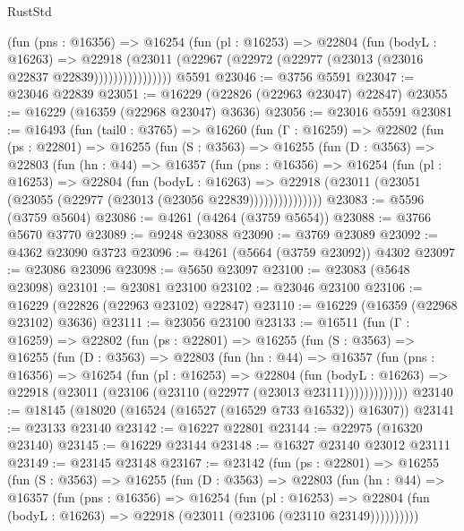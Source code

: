 \begin{lexlean}{RustStd}
\begin{coremodule}
                  (fun (pns : @16356) =>
                  @16254
                    (fun (pl : @16253) =>
                    @22804
                      (fun (bodyL : @16263) =>
                      @22918
                        (@23011
                          (@22967 (@22972 (@22977 (@23013 (@23016 @22837 @22839))))))))))))))))
    @5591
@23046 := @3756 @5591
@23047 := @23046 @22839
@23051 := @16229 (@22826 (@22963 @23047) @22847)
@23055 := @16229 (@16359 (@22968 @23047) @3636)
@23056 := @23016 @5591
@23081 := @16493
    (fun (tail0 : @3765) =>
    @16260
      (fun (Γ : @16259) =>
      @22802
        (fun (ps : @22801) =>
        @16255
          (fun (S : @3563) =>
          @16255
            (fun (D : @3563) =>
            @22803
              (fun (hn : @44) =>
              @16357
                (fun (pns : @16356) =>
                @16254
                  (fun (pl : @16253) =>
                  @22804
                    (fun (bodyL : @16263) =>
                    @22918 (@23011 (@23051 (@23055 (@22977 (@23013 (@23056 @22839)))))))))))))))
@23083 := @5596 (@3759 @5604)
@23086 := @4261 (@4264 (@3759 @5654))
@23088 := @3766 @5670 @3770
@23089 := @9248 @23088
@23090 := @3769 @23089
@23092 := @4362 @23090 @3723
@23096 := @4261 (@5664 (@3759 @23092)) @4302
@23097 := @23086 @23096
@23098 := @5650 @23097
@23100 := @23083 (@5648 @23098)
@23101 := @23081 @23100
@23102 := @23046 @23100
@23106 := @16229 (@22826 (@22963 @23102) @22847)
@23110 := @16229 (@16359 (@22968 @23102) @3636)
@23111 := @23056 @23100
@23133 := @16511
    (fun (Γ : @16259) =>
    @22802
      (fun (ps : @22801) =>
      @16255
        (fun (S : @3563) =>
        @16255
          (fun (D : @3563) =>
          @22803
            (fun (hn : @44) =>
            @16357
              (fun (pns : @16356) =>
              @16254
                (fun (pl : @16253) =>
                @22804
                  (fun (bodyL : @16263) =>
                  @22918 (@23011 (@23106 (@23110 (@22977 (@23013 @23111)))))))))))))
@23140 := @18145 (@18020 (@16524 (@16527 (@16529 @733 @16532)) @16307))
@23141 := @23133 @23140
@23142 := @16227 @22801
@23144 := @22975 (@16320 @23140)
@23145 := @16229 @23144
@23148 := @16327 @23140 @23012 @23111
@23149 := @23145 @23148
@23167 := @23142
    (fun (ps : @22801) =>
    @16255
      (fun (S : @3563) =>
      @16255
        (fun (D : @3563) =>
        @22803
          (fun (hn : @44) =>
          @16357
            (fun (pns : @16356) =>
            @16254
              (fun (pl : @16253) =>
              @22804 (fun (bodyL : @16263) => @22918 (@23011 (@23106 (@23110 @23149))))))))))

\end{coremodule}
\end{lexlean}
